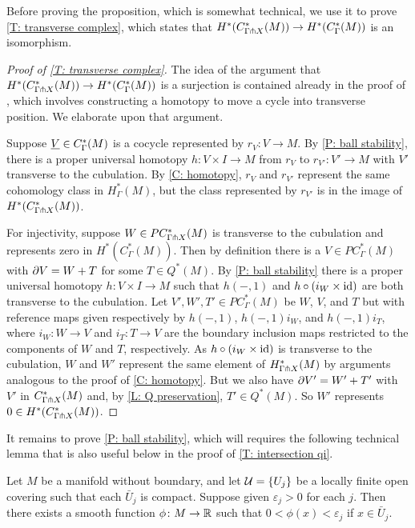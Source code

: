 Before proving the proposition, which is somewhat technical, we use it to prove \cref{T: transverse complex}, which states that $H^*(C^*_{\Gamma \pitchfork X}(M)) \to H^*(C_\Gamma^*(M))$ is an isomorphism.

\begin{proof}[Proof of \cref{T: transverse complex}]
	The idea of the argument that $H^*(C^*_{\Gamma \pitchfork X}(M)) \to H^*(C_\Gamma^*(M))$ is a surjection is contained already in the proof of \cite[Lemma 15]{Lipy14}, which involves constructing a homotopy to move a cycle into transverse position.
	We elaborate upon that argument.

	Suppose $\underline{V} \in C_\Gamma^*(M)$ is a cocycle represented by $r_V \colon V \to M$.
	By \cref{P: ball stability}, there is a proper universal homotopy $h \colon V \times I \to M$ from $r_V$ to $r_{V'} \colon V' \to M$ with $V'$ transverse to the cubulation.
	By \cref{C: homotopy}, $r_V$ and $r_{V'}$ represent the same cohomology class in $H^*_{\Gamma}(M)$, but the class represented by $r_{V'}$ is in the image of $H^*(C^*_{\Gamma \pitchfork X}(M))$.

	For injectivity, suppose $W \in PC^*_{\Gamma \pitchfork X}(M)$ is transverse to the cubulation and represents zero in $H^*(C_\Gamma^*(M))$.
	Then by definition there is a $V \in PC^*_\Gamma(M)$ with $\partial V = W+T$ for some
	$T \in Q^*(M)$.
	By \cref{P: ball stability} there is a proper universal homotopy $h \colon V \times I \to M$ such that $h(-,1)$ and $h \circ (i_{W} \times \mathrm{id})$ are both transverse to the cubulation.
	Let $V', W',T' \in PC^*_\Gamma(M)$ be $W$, $V$, and $T$ but with reference maps given respectively by $h(-,1)$, $h(-,1)i_W$, and $h(-,1)i_T$, where $i_W \colon W \to V$ and $i_T \colon T \to V$ are the boundary inclusion maps restricted to the components of $W$ and $T$, respectively.
	As $h \circ (i_{W} \times \mathrm{id})$ is transverse to the cubulation, $W$ and $W'$ represent the same element of $H^*_{\Gamma \pitchfork X}(M)$ by arguments analogous to the proof of \cref{C: homotopy}.
	But we also have $\partial V' = W'+T'$ with $V'$ in $C^*_{\Gamma \pitchfork X}(M)$ and, by \cref{L: Q preservation}, $T' \in Q^*(M)$.
	So $W'$ represents $0 \in H^*(C^*_{\Gamma \pitchfork X}(M))$.
\end{proof}

It remains to prove \cref{P: ball stability}, which will requires the following technical lemma that is also useful below in the proof of \cref{T: intersection qi}.

\begin{lemma}\label{L: minimizer}
	Let $M$ be a manifold without boundary, and let $\mathcal{U} = \{U_j\}$ be a locally finite open covering such that each $\bar U_j$ is compact.
	Suppose given $\varepsilon_j>0$ for each $j$.
	Then there exists a smooth function $\phi \colon M \to \mathbb{R}$ such that $0<\phi(x)<\varepsilon_j$ if $x \in \bar U_j$.
\end{lemma}

